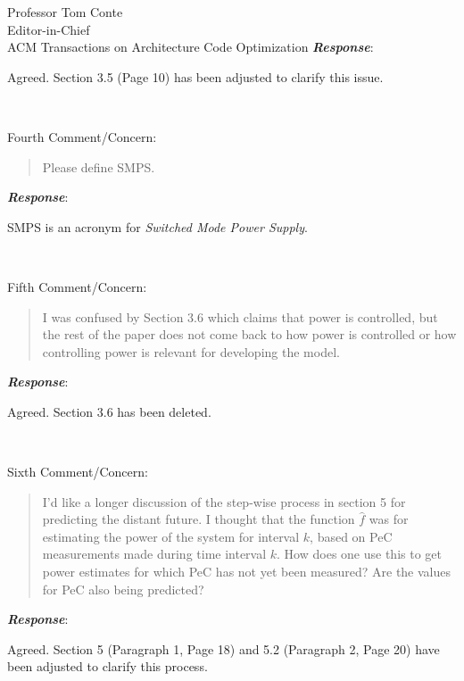 \documentclass[10pt]{letter} %
\newenvironment{rviewcomment}
{~\\%
\begin{bfseries}}
{\end{bfseries}}
\newcommand{\rviewresponse}{\textbf{\textit{Response}}:}
\begin{document}
\begin{letter}{Professor Tom Conte \\
Editor-in-Chief \\
ACM Transactions on Architecture Code Optimization }
\rviewresponse

Agreed. Section 3.5 (Page 10) has been adjusted to clarify this issue.

\begin{rviewcomment}
  Fourth Comment/Concern:
\end{rviewcomment}
\begin{quote}
  \begin{itshape}
    Please define SMPS.
  \end{itshape}
\end{quote}


\rviewresponse
 
SMPS is an acronym for \textit{Switched Mode Power Supply}. 


\begin{rviewcomment}
  Fifth Comment/Concern:
\end{rviewcomment}
\begin{quote}
\begin{itshape} 
  I was confused by Section 3.6 which claims that power is controlled,
  but the rest of the paper does not come back to how power is
  controlled or how controlling power is relevant for developing the
  model.
\end{itshape}
\end{quote}

\rviewresponse

Agreed. Section 3.6 has been deleted.

\begin{rviewcomment}
  Sixth Comment/Concern:
\end{rviewcomment}
\begin{quote}
\begin{itshape} 
I'd like a longer discussion of the step-wise process in section 5 for
predicting the distant future. I thought that the function $\hat{f}$ was for
estimating the power of the system for interval $k$, based on PeC
measurements made during time interval $k$. How does one use this to get
power estimates for which PeC has not yet been measured? Are the values
for PeC also being predicted?
\end{itshape}
\end{quote}

\rviewresponse 

Agreed.  Section 5 (Paragraph 1, Page 18) and 5.2 (Paragraph 2, Page 20)
have been adjusted to clarify this process.


\end{letter}
\end{document}
